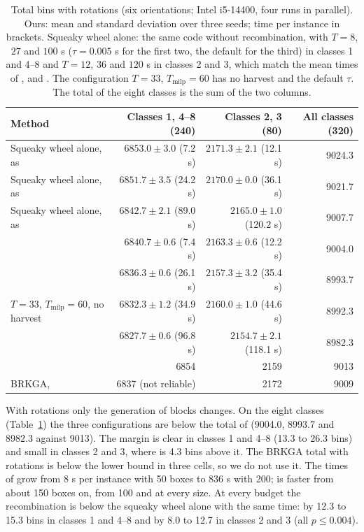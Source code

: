 \begin{table}[t]
\centering
\small\setlength{\tabcolsep}{4pt}
\caption{Total bins with rotations (six orientations; Intel i5-14400, four runs in parallel). Ours: mean and standard deviation over three seeds; time per instance in brackets. Squeaky wheel alone:
the same code without recombination, with $T=8$, $27$ and $100$ s ($\tau=0.005$ s for the first two, the default for the third) in classes 1 and 4--8 and $T=12$, $36$ and $120$ s in classes 2 and 3,
which match the mean times of \cfgfast{}, \cfgbal{} and \cfgqual{}. The configuration $T=33$, $T_{\mathrm{milp}}=60$ has no harvest and the default $\tau$. The total of the eight classes is the sum of the two columns.}
\label{tab:e-rot}
\begin{tabular}{@{}lrrr@{}}
\toprule
Method & Classes 1, 4--8 (240) & Classes 2, 3 (80) & All classes (320)\\
\midrule
Squeaky wheel alone, as \cfgfast{} & $6853.0\pm 3.0$ (7.2 s) & $2171.3\pm 2.1$ (12.1 s) & 9024.3\\
Squeaky wheel alone, as \cfgbal{} & $6851.7\pm 3.5$ (24.2 s) & $2170.0\pm 0.0$ (36.1 s) & 9021.7\\
Squeaky wheel alone, as \cfgqual{} & $6842.7\pm 2.1$ (89.0 s) & $2165.0\pm 1.0$ (120.2 s) & 9007.7\\
\midrule
\cfgfast{} & $6840.7\pm 0.6$ (7.4 s) & $2163.3\pm 0.6$ (12.2 s) & 9004.0\\
\cfgbal{} & $6836.3\pm 0.6$ (26.1 s) & $2157.3\pm 3.2$ (35.4 s) & 8993.7\\
$T=33$, $T_{\mathrm{milp}}=60$, no harvest & $6832.3\pm 1.2$ (34.9 s) & $2160.0\pm 1.0$ (44.6 s) & 8992.3\\
\cfgqual{} & $6827.7\pm 0.6$ (96.8 s) & $2154.7\pm 2.1$ (118.1 s) & 8982.3\\
\midrule
\citet{Mahvash2018} & 6854 & 2159 & 9013\\
BRKGA, \citet{Goncalves2013} & 6837 (not reliable) & 2172 & 9009\\
\bottomrule
\end{tabular}
\end{table}

With rotations only the generation of blocks changes. On the eight classes (Table~\ref{tab:e-rot}) the three
configurations are below the total of \citet{Mahvash2018} (9004.0, 8993.7 and 8982.3 against 9013). The margin is clear
in classes 1 and 4--8 (13.3 to 26.3 bins) and small in classes 2 and 3, where \cfgfast{} is 4.3 bins above it. The BRKGA
total with rotations is below the lower bound in three cells, so we do not use it. The times of \citet{Mahvash2018} grow
from 8 s per instance with 50 boxes to 836 s with 200; \cfgqual{} is faster from about 150 boxes on, \cfgbal{} from 100
and \cfgfast{} at every size. At every budget the recombination is below the squeaky wheel alone with the same time:
by 12.3 to 15.3 bins in classes 1 and 4--8 and by 8.0 to 12.7 in classes 2 and 3 (all $p\le 0.004$).

